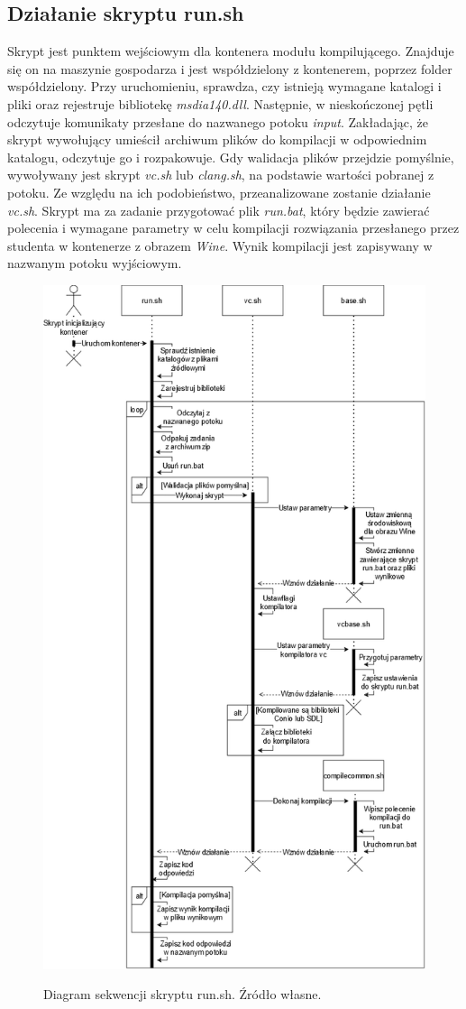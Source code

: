 \subsection{Działanie skryptu run.sh}
Skrypt jest punktem wejściowym dla kontenera modułu kompilującego. Znajduje się on na maszynie gospodarza i jest współdzielony z kontenerem, poprzez folder współdzielony. Przy uruchomieniu, sprawdza, czy istnieją wymagane katalogi i pliki oraz rejestruje bibliotekę \textit{msdia140.dll}. Następnie, w nieskończonej pętli odczytuje komunikaty przesłane do nazwanego potoku \textit{input}. Zakładając, że skrypt wywołujący umieścił archiwum plików do kompilacji w odpowiednim katalogu, odczytuje go i rozpakowuje. Gdy walidacja plików przejdzie pomyślnie, wywoływany jest skrypt \textit{vc.sh} lub \textit{clang.sh}, na podstawie wartości pobranej z potoku. Ze względu na ich podobieństwo, przeanalizowane zostanie działanie \textit{vc.sh}. Skrypt ma za zadanie przygotować plik \textit{run.bat}, który będzie zawierać polecenia i wymagane parametry w celu kompilacji rozwiązania przesłanego przez studenta w kontenerze z obrazem \textit{Wine}. Wynik kompilacji jest zapisywany w nazwanym potoku wyjściowym.
\begin{figure}[!h]
	\begin{center}
		\resizebox{0.8\textwidth}{!} {
			\includegraphics{img/2/run.png}
		}
		\caption[Diagram sekwencji skryptu run.sh]{Diagram sekwencji skryptu run.sh. Źródło własne.}
	\end{center}
\end{figure}